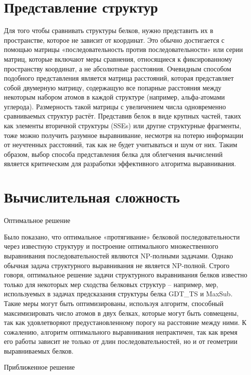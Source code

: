 \documentclass[a4paper]{extreport}
\begin{document}
\section{Представление структур}

Для того чтобы сравнивать структуры белков, нужно представить их в пространстве, которое не зависит от координат. Это обычно достигается с помощью матрицы «последовательность против последовательности» или серии матриц, которые включают меры сравнения, относящиеся к фиксированному пространству координат, а не абсолютные расстояния. Очевидным способом подобного представления является матрица расстояний, которая представляет собой двумерную матрицу, содержащую все попарные расстояния между некоторым набором атомов в каждой структуре (например, альфа-атомами углерода). Размерность такой матрицы с увеличением числа одновременно сравниваемых структур растёт. Представив белок в виде крупных частей, таких как элементы вторичной структуры (SSEs) или другие структурные фрагменты, тоже можно получить разумное выравнивание, несмотря на потерю информации от неучтенных расстояний, так как не будет учитываться и шум от них. Таким образом, выбор способа представления белка для облегчения вычислений является критическим для разработки эффективного алгоритма выравнивания.  

\section{Вычислительная сложность}

Оптимальное решение

Было показано, что оптимальное «протягивание» белковой последовательности через известную структуру и построение оптимального множественного выравнивания последовательностей являются NP-полными задачами. Однако обычная задача структурного выравнивания не является NP-полной. Строго говоря, оптимальное решение задачи структурного выравнивания белков известно только для некоторых мер сходства белковых структур -- например, мер, используемых в задачах предсказания структуры белка GDT\_TS и MaxSub. Такие меры могут быть оптимизированы, используя алгоритм, способный максимизировать число атомов в двух белках, которые могут быть совмещены, так как удовлетворяют предустановленному порогу на расстояние между ними. К сожалению, алгоритм оптимального выравнивания непрактичен, так как время его работы зависит не только от длин последовательностей, но и от геометрии выравниваемых белков.

Приближенное решение
\end{document}
